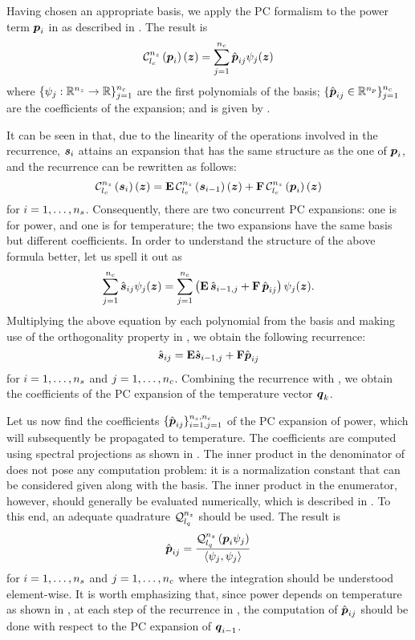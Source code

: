 Having chosen an appropriate basis, we apply the \ac{PC} formalism to the power
term $\boldsymbol{p}_i$ in  as described in
. The result is
\[
  \chaos{\nz}{\lc}{\vp_i}(\vz) = \sum_{j = 1}^\nc \hat{\vp}_{ij} \psi_j(\vz)
\]
where $\{ \psi_j: \mathbb{R}^{n_{z}} \to \mathbb{R} \}_{j = 1}^{n_{c}}$ are the first \nc
polynomials of the basis; $\{ \hat{\boldsymbol{p}}_{ij} \in \mathbb{R}^{n_{p}} \}_{j = 1}^{n_{c}}$ are
the coefficients of the expansion; and \nc is given by
.

It can be seen in  that, due to the linearity of
the operations involved in the recurrence, $\boldsymbol{s}_i$ attains an expansion that has
the same structure as the one of $\boldsymbol{p}_i$, and the recurrence can be rewritten as
follows:
\[
  \chaos{\nz}{\lc}{\vs_i}(\vz) = \m{E} \, \chaos{\nz}{\lc}{\vs_{i - 1}}(\vz) + \m{F} \, \chaos{\nz}{\lc}{\vp_i}(\vz)
\]
for $i = 1, \dots, {n_{s}}$. Consequently, there are two concurrent \ac{PC}
expansions: one is for power, and one is for temperature; the two expansions
have the same basis but different coefficients. In order to understand the
structure of the above formula better, let us spell it out as
\[
  \sum_{j = 1}^{n_{c}} \hat{\boldsymbol{s}}_{ij} \psi_j(\boldsymbol{z}) =
  \sum_{j = 1}^{n_{c}} \left( \mathbf{E} \, \hat{\boldsymbol{s}}_{i - 1, j} + \mathbf{F} \, \hat{\boldsymbol{p}}_{ij} \right) \psi_j(\boldsymbol{z}).
\]
Multiplying the above equation by each polynomial from the basis and making use
of the orthogonality property in , we obtain the
following recurrence:
\begin{equation} \elab{chaos-recurrence}
  \hat{\vs}_{ij} = \m{E} \hat{\vs}_{i - 1, j} + \m{F} \hat{\vp}_{ij}
\end{equation}
for $i = 1, \dots, {n_{s}}$ and $j = 1, \dots, {n_{c}}$. Combining the recurrence with
, we obtain the coefficients of the \ac{PC}
expansion of the temperature vector $\boldsymbol{q}_k$.

Let us now find the coefficients $\{ \hat{\boldsymbol{p}}_{ij} \}_{i = 1, j = 1}^{{n_{s}},
{n_{c}}}$ of the \ac{PC} expansion of power, which will subsequently be propagated
to temperature. The coefficients are computed using spectral projections as
shown in . The inner product in the denominator of
 does not pose any computation problem: it is a
normalization constant that can be considered given along with the basis. The
inner product in the enumerator, however, should generally be evaluated
numerically, which is described in . To this end, an
adequate quadrature $\quadrature{\nz}{\lq}$ should be used. The result is
\begin{equation} \elab{chaos-coefficient}
  \hat{\vp}_{ij} = \frac{\quadrature{\nz}{\lq}{\vp_i \psi_j}}{\innerproduct{\psi_j}{\psi_j}}
\end{equation}
for $i = 1, \dots, {n_{s}}$ and $j = 1, \dots, {n_{c}}$ where the integration should
be understood element-wise. It is worth emphasizing that, since power depends on
temperature as shown in , at each step of the recurrence in
, the computation of $\hat{\boldsymbol{p}}_{ij}$ should be done with
respect to the \ac{PC} expansion of $\boldsymbol{q}_{i - 1}$.

